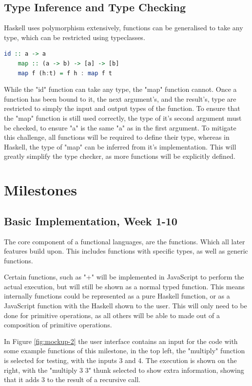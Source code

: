 \documentclass[a4paper]{article}
\begin{document}
\subsection{Type Inference and Type Checking}
Haskell uses polymorphism extensively, functions can be generalised to take any type, which can be restricted using typeclasses.
\begin{lstlisting}[language=haskell, caption=Polymorphism]
    id :: a -> a
    map :: (a -> b) -> [a] -> [b]
    map f (h:t) = f h : map f t
\end{lstlisting}
While the "id" function can take any type, the "map" function cannot. Once a function has been bound to it, the next argument's, and the result's, type are restricted to simply the input and output types of the function.
To ensure that the "map" function is still used correctly, the type of it's second argument must be checked, to ensure "a" is the same "a" as in the first argument.
To mitigate this challenge, all functions will be required to define their type, whereas in Haskell, the type of "map" can be inferred from it's implementation. This will greatly simplify the type checker, as more functions will be explicitly defined.
\section{Milestones}
\subsection{Basic Implementation, Week 1-10}
The core component of a functional languages, are the functions. Which all later features build upon. This includes functions with specific types, as well as generic functions.

Certain functions, such as "+" will be implemented in JavaScript to perform the actual execution, but will still be shown as a normal typed function. This means internally functions could be represented as a pure Haskell function, or as a JavaScript function with the Haskell shown to the user. This will only need to be done for primitive operations, as all others will be able to made out of a composition of primitive operations.

In Figure \ref{fig:mockup-2} the user interface contains an input for the code with some example functions of this milestone, in the top left, the "multiply" function is selected for testing, with the inputs 3 and 4. The execution is shown on the right, with the "multiply 3 3" thunk selected to show extra information, showing that it adds 3 to the result of a recursive call.
\end{document}
